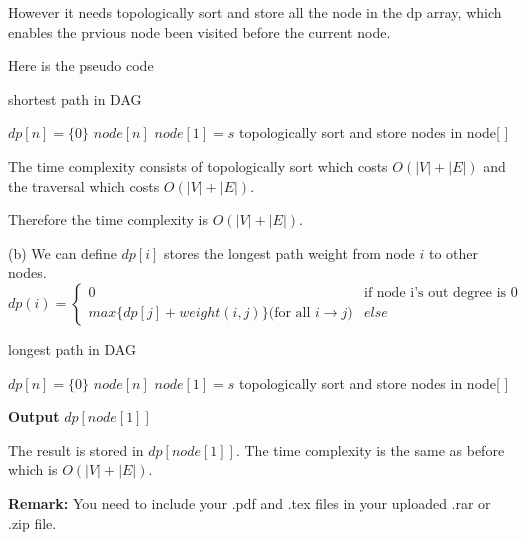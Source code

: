 \documentclass[12pt,a4paper]{article}
\theoremstyle{definition}
\begin{document}
\begin{enumerate}
	However it needs topologically sort and store all the node in the dp array, which enables the prvious node been visited before the current node.

	Here is the pseudo code 

	\begin{algorithm}[H]
		\BlankLine
		\caption{shortest path in DAG}
		$dp[n] = \{0\}$\;
		$node[n] $\;
		$node[1] = s$\;
		topologically sort and store nodes in node[ ]\;
		
	\end{algorithm}
	
	The time complexity consists of topologically sort which costs $O(|V|+|E|)$ and the traversal which costs $O(|V|+|E|)$.

	Therefore the time complexity is $O(|V|+|E|)$.

	\newpage
	(b)
	We can define $dp[i]$ stores the longest path weight from node $i$ to other nodes.
	\begin{equation}
		dp(i)=
		\begin{cases}
			0&\mbox{if node i's out degree is 0}\\
			max\{dp[j]+weight(i,j)\}\mbox{(for all $i\rightarrow j$)}&else
		\end{cases}
	\end{equation}

	\begin{algorithm}[H]
		\BlankLine
		\caption{longest path in DAG}
		$dp[n] = \{0\}$\;
		$node[n] $\;
		$node[1] = s$\;
		topologically sort and store nodes in node[ ]\;
		
		\textbf{Output} $dp[node[1]]$\;
	\end{algorithm}
	The result is stored in $dp[node[1]]$.
	The time complexity is the same as before which is $O(|V|+|E|)$.



\end{enumerate}

\vspace{20pt}

\textbf{Remark:} You need to include your .pdf and .tex files in your uploaded .rar or .zip file.

\end{document}
